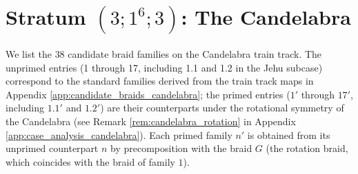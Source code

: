 \section{Stratum $(3;1^6;3)$: The Candelabra}

We list the $38$ candidate braid families on the Candelabra train track. The unprimed entries (1 through 17, including 1.1 and 1.2 in the Jehu subcase) correspond to the standard families derived from the train track maps in Appendix \ref{app:candidate_braids_candelabra}; the primed entries ($1'$ through $17'$, including $1.1'$ and $1.2'$) are their counterparts under the rotational symmetry of the Candelabra (see Remark \ref{rem:candelabra_rotation} in Appendix \ref{app:case_analysis_candelabra}). Each primed family $n'$ is obtained from its unprimed counterpart $n$ by precomposition with the braid $G$ (the rotation braid, which coincides with the braid of family $1$).

